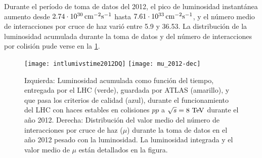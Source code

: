 Durante el período de toma de datos del 2012, el pico de luminosidad instantánea
aumento desde $\unit[2.74 \cdot 10^{30}]{cm^{-2} s^{-1}}$ hasta
$\unit[7.61 \cdot 10^{33}]{cm^{-2} s^{-1}}$, y el número medio de interacciones por cruce
de haz varió entre 5.9 y 36.53. La distribución de la luminosidad acumulada
durante la toma de datos y del número de interacciones por colisión pude verse en
la \cref{fig:lumi}.

\begin{figure}[!htb]
  \centering

  \texttt{[image: intlumivstime2012DQ]}
  \texttt{[image: mu\_2012-dec]}

  \caption{Izquierda: Luminosidad acumulada como función del tiempo, entregada por el LHC (verde),
    guardada por ATLAS (amarillo), y que pasa los criterios de calidad (azul),
    durante el funcionamiento del LHC con haces estables en colisiones $pp$ a $\sqrt{s}=8\tev$ durante el a\~no 2012\cite{lumiplots}.
    Derecha: Distribución del valor medio del número de interacciones por cruce
    de haz ($\mu$) durante la toma de datos en el a\~no 2012 pesado con la luminosidad.
    La luminosidad integrada y el valor medio de $\mu$ están detallados en la figura.
  }
  \label{fig:lumi}

\end{figure}

